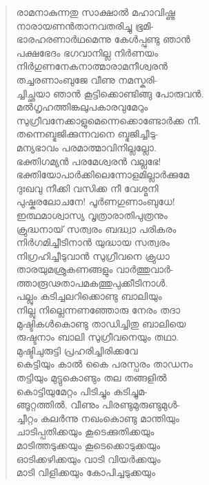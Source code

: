 \begin{verse}
രാമനാകുന്നതു സാക്ഷാല്‍ മഹാവിഷ്ണു\\
നാരായണന്‍താനവതരിച്ചു ഭൂമി-\\
ഭാരഹരണാര്‍ഥമെന്നു കേള്‍പ്പുണ്ടു ഞാന്‍\\
പക്ഷഭേദം ഭഗവാനില്ല നിര്‍ണയം\\
നിര്‍ഗുണനേകനാത്മാരാമനീശ്വരന്‍\\
തച്ചരണാംബുജേ വീണു നമസ്കരി-\\
ച്ചിച്ഛയാ ഞാന്‍ കൂട്ടിക്കൊണ്ടിങ്ങു പോരുവന്‍.\\
മല്‍ഗൃഹത്തിങ്കലുപകാരവുമേറും\\
സുഗ്രീവനേക്കാളുമെന്നെക്കൊണ്ടോര്‍ക്ക നീ.\\
തന്നെബ്ഭജിക്കുന്നവനെ ബ്ഭജിച്ചീടു-\\
മന്യഭാവം പരമാത്മാവിനില്ലല്ലോ.\\
ഭക്തിഗമ്യന്‍ പരമേശ്വരന്‍ വല്ലഭേ!\\
ഭക്തിയോപാര്‍ക്കിലെന്നോളമില്ലാര്‍ക്കുമേ\\
ദുഃഖവു നീക്കി വസിക്ക നീ വേശ്മനി\\
പുഷ്കരലോചനേ! പൂര്‍ണഗുണാംബുധേ!\\
ഇത്ഥമാശ്വാസ്യ വൃത്രാരാതിപുത്രനും\\
ക്രുദ്ധനായ് സത്വരം ബദ്ധ്വാ പരികരം\\
നിര്‍ഗമിച്ചീടിനാന്‍ യുദ്ധായ സത്വരം\\
നിഗ്രഹിച്ചീടുവാന്‍ സുഗ്രീവനെ ക്രുധാ\\
താരയുമശ്രുകണങ്ങളും വാര്‍ത്തുവാര്‍-\\
ത്താരൂഢതാപമകത്തുപുക്കീടിനാള്‍.\\
പല്ലും കടിച്ചലറിക്കൊണ്ടു ബാലിയും\\
നില്ലു നില്ലെന്നണഞ്ഞോരു നേരം തദാ\\
മുഷ്ടികള്‍കൊണ്ടു താഡിച്ചിതു ബാലിയെ\\
രുഷ്ടനാം ബാലി സുഗ്രീവനെയും തഥാ.\\
മുഷ്ടിചുരുട്ടി പ്രഹരിച്ചിരിക്കവേ\\
കെട്ടിയും കാല്‍ കൈ പരസ്പരം താഡനം\\
തട്ടിയും മുട്ടുകൊണ്ടും തല തങ്ങളില്‍\\
കൊട്ടിയുമേറ്റം പിടിച്ചും കടിച്ചുമ-\\
ങ്ങൂറ്റത്തില്‍, വീണും പിരണ്ടുമുരുണ്ടുമുള്‍-\\
ച്ചീറ്റം കലര്‍ന്നു നഖംകൊണ്ടു മാന്തിയും\\
ചാടിപ്പതിക്കയും കൂടെക്കുതിക്കയും\\
മാടിത്തടുക്കയും കൂടെക്കൊടുക്കയും\\
ഓടിക്കഴിക്കയും വാടി വിയര്‍ക്കയും\\
മാടി വിളിക്കയും കോപിച്ചടുക്കയും\\

\end{verse}
